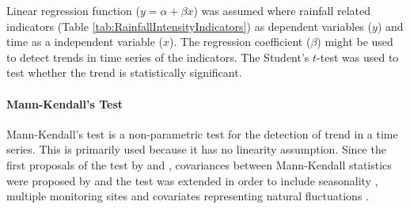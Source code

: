 %


Linear regression function ($y=\alpha + \beta x$) was assumed where rainfall
related indicators (Table \ref{tab:RainfallIntensityIndicators}) as dependent
variables ($y$) and time as a independent variable ($x$). The regression
coefficient ($\beta$) might be used to detect trends in time series of the
indicators. The Student's $t$-test was used to test whether the trend is
statistically significant.



\paragraph{Mann-Kendall's Test}
\label{sec:MannKendallSTest}

Mann-Kendall's test is a non-parametric test for the detection of trend in a
time series. This is primarily used because it has no linearity assumption.
Since the first proposals of the test by \citet{mann1945-245} and
\citet{kendall1975-202}, covariances between Mann-Kendall statistics were
proposed by \citet{dietz1981-169} and the test was extended in order to include
seasonality \citep{hirsch1984-727}, multiple monitoring sites
\citep{lettenmaier1988-505} and covariates representing natural fluctuations
\citep{libiseller2002-71}.


